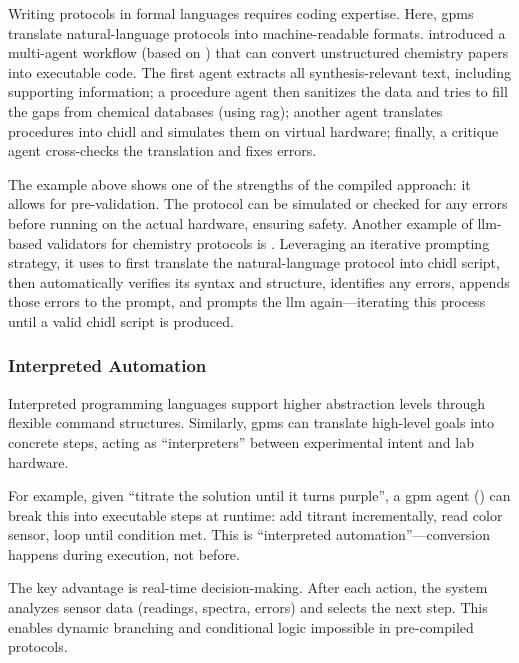 Writing protocols in formal languages requires coding expertise. Here, \glspl{gpm} translate natural-language protocols into machine-readable formats.\autocite{Lamas2024DSLXpert, jiang2024protocode, conrad2025lowering, inagaki2023robotic,Vaucher2020AutoExtraction}
\textcite{Pagel2024LLMChemputer} introduced a multi-agent workflow (based on ) that can convert unstructured chemistry papers into executable code. 
The first agent extracts all synthesis-relevant text, including supporting information; a procedure agent then sanitizes the data and tries to fill the gaps from chemical databases (using \gls{rag}); another agent translates procedures into \gls{chidl} and simulates them on virtual hardware; finally, a critique agent cross-checks the translation and fixes errors.

The example above shows one of the strengths of the compiled approach: it allows for pre-validation. 
The protocol can be simulated or checked for any errors before running on the actual hardware, ensuring safety. 
Another example of \gls{llm}-based validators for chemistry protocols is .\autocite{Yoshikawa2023CLAIRify} 
Leveraging an iterative prompting strategy, it uses  to first translate the natural-language protocol into \gls{chidl} script, then automatically verifies its syntax and structure, identifies any errors, appends those errors to the prompt, and prompts the \gls{llm} again---iterating this process until a valid \gls{chidl} script is produced. 


\subsubsection{Interpreted Automation}
Interpreted programming languages support higher abstraction levels through flexible command structures. Similarly, \glspl{gpm} can translate high-level goals into concrete steps,\autocite{ahn2022can, huang2022language} acting as \enquote{interpreters} between experimental intent and lab hardware.

For example, given \enquote{titrate the solution until it turns purple}, a \gls{gpm} agent () can break this into executable steps at runtime: add titrant incrementally, read color sensor, loop until condition met. This is \enquote{interpreted automation}---conversion happens during execution, not before.

The key advantage is real-time decision-making. After each action, the system analyzes sensor data (readings, spectra, errors) and selects the next step. This enables dynamic branching and conditional logic impossible in pre-compiled protocols.

